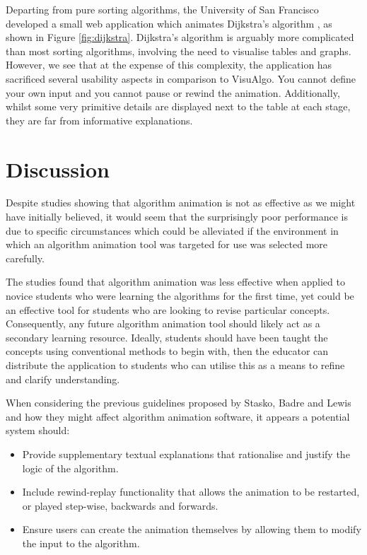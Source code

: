 \documentclass{l4proj}
\begin{document}
Departing from pure sorting algorithms, the University of San Francisco developed a small web application which animates Dijkstra's algorithm \cite{dijkstra}, as shown in Figure \ref{fig:dijkstra}. Dijkstra's algorithm is arguably more complicated than most sorting algorithms, involving the need to visualise tables and graphs. However, we see that at the expense of this complexity, the application has sacrificed several usability aspects in comparison to VisuAlgo. You cannot define your own input and you cannot pause or rewind the animation. Additionally, whilst some very primitive details are displayed next to the table at each stage, they are far from informative explanations. 

\section{Discussion}
Despite studies showing that algorithm animation is not as effective as we might have initially believed, it would seem that the surprisingly poor performance is due to specific circumstances which could be alleviated if the environment in which an algorithm animation tool was targeted for use was selected more carefully. 

The studies found that algorithm animation was less effective when applied to novice students who were learning the algorithms for the first time, yet could be an effective tool for students who are looking to revise particular concepts. Consequently, any future algorithm animation tool should likely act as a secondary learning resource. Ideally, students should have been taught the concepts using conventional methods to begin with, then the educator can distribute the application to students who can utilise this as a means to refine and clarify understanding.

When considering the previous guidelines proposed by Stasko, Badre and Lewis and how they might affect algorithm animation software, it appears a potential system should:
\begin{itemize}
\item Provide supplementary textual explanations that rationalise and justify the logic of the algorithm.
\item Include rewind-replay functionality that allows the animation to be restarted, or played step-wise, backwards and forwards.
\item Ensure users can create the animation themselves by allowing them to modify the input to the algorithm.
\end{itemize}
\end{document}
